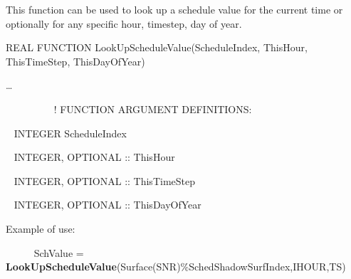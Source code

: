 This function can be used to look up a schedule value for the current time or optionally for any specific hour, timestep, day of year.

REAL FUNCTION LookUpScheduleValue(ScheduleIndex, ThisHour, ThisTimeStep, ThisDayOfYear)

\ldots{}

~~~~~~~~~ ! FUNCTION ARGUMENT DEFINITIONS:

~ INTEGER ScheduleIndex

~ INTEGER, OPTIONAL :: ThisHour

~ INTEGER, OPTIONAL :: ThisTimeStep

~ INTEGER, OPTIONAL :: ThisDayOfYear

Example of use:

~~~~~ SchValue = \textbf{LookUpScheduleValue}(Surface(SNR)\%SchedShadowSurfIndex,IHOUR,TS)
